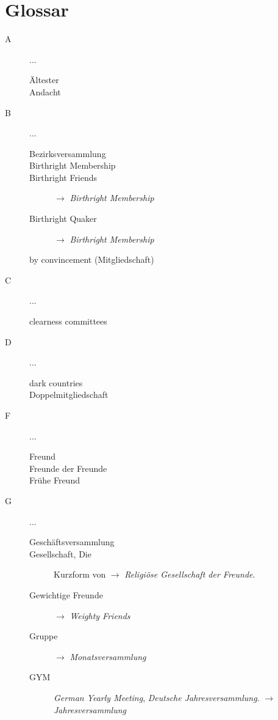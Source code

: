 \chapter{Glossar}
\begin{description}
 \item[A] ...
\begin{description}
 \item[Ältester]
 \item[Andacht]
 \end{description}
 \item[B] ...
\begin{description}
 \item[Bezirksversammlung]
 \item[Birthright Membership]
 \item[Birthright Friends] $\to$ \textit{Birthright Membership}
 \item[Birthright Quaker] $\to$ \textit{Birthright Membership}
 \item[by convincement (Mitgliedschaft)]
 \end{description}
 \item[C]...
\begin{description}
 \item[clearness committees]
 \end{description}
 \item[D]...
\begin{description}
 \item[dark countries]
 \item[Doppelmitgliedschaft]
 \end{description}
 \item[F]...
\begin{description}
 \item[Freund]
 \item[Freunde der Freunde]
 \item[Frühe Freund]
 \end{description}
 \item[G]...
\begin{description}
 \item[Geschäftsversammlung]
 \item[Gesellschaft, Die] Kurzform von $\to$ \textit{Religiöse Gesellschaft der Freunde}.
 \item[Gewichtige Freunde] $\to$ \textit{Weighty Friends}
 \item[Gruppe] $\to$ \textit{Monatsversammlung}
 \item[GYM] \textit{German Yearly Meeting}, \textit{Deutsche Jahresversammlung}. $\to$ \textit{Jahresversammlung}

\end{description}
\end{description}
